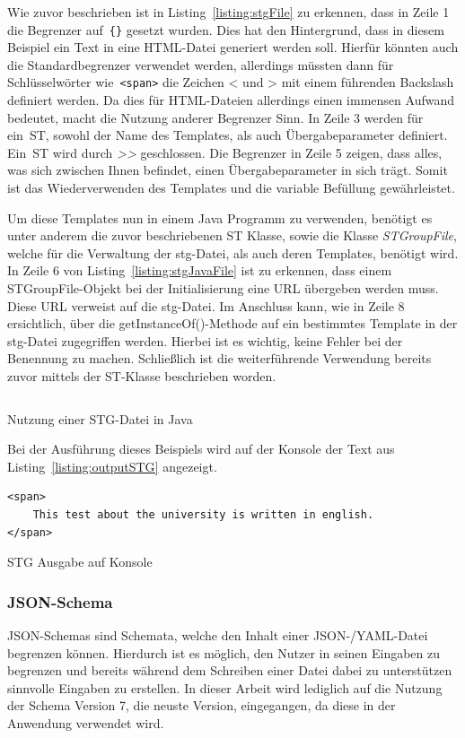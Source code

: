 Wie zuvor beschrieben ist in Listing~\ref{listing:stgFile} zu erkennen, dass in Zeile 1 die Begrenzer auf~\texttt{\{\}} gesetzt wurden.
Dies hat den Hintergrund, dass in diesem Beispiel ein Text in eine HTML-Datei generiert werden soll.
Hierfür könnten auch die Standardbegrenzer verwendet werden, allerdings müssten dann für Schlüsselwörter wie~\texttt{<span>} die Zeichen < und > mit einem führenden Backslash definiert werden.
Da dies für HTML-Dateien allerdings einen immensen Aufwand bedeutet, macht die Nutzung anderer Begrenzer Sinn.
In Zeile 3 werden für ein~\ac{ST}, sowohl der Name des Templates, als auch Übergabeparameter definiert.
Ein~\ac{ST} wird durch \textit{>>} geschlossen.
Die Begrenzer in Zeile 5 zeigen, dass alles, was sich zwischen Ihnen befindet, einen Übergabeparameter in sich trägt.
Somit ist das Wiederverwenden des Templates und die variable Befüllung gewährleistet.

Um diese Templates nun in einem Java Programm zu verwenden, benötigt es unter anderem die zuvor beschriebenen ST Klasse, sowie
die Klasse \textit{STGroupFile}, welche für die Verwaltung der stg-Datei, als auch deren Templates, benötigt wird.
In Zeile 6 von Listing~\ref{listing:stgJavaFile} ist zu erkennen, dass einem STGroupFile-Objekt bei der Initialisierung eine URL übergeben werden muss.
Diese URL verweist auf die stg-Datei.
Im Anschluss kann, wie in Zeile 8 ersichtlich, über die getInstanceOf()-Methode auf ein bestimmtes Template in der stg-Datei zugegriffen werden.
Hierbei ist es wichtig, keine Fehler bei der Benennung zu machen.
Schließlich ist die weiterführende Verwendung bereits zuvor mittels der ST-Klasse beschrieben worden.

\begin{listing}[!ht]
    \inputminted{java}{listings/2.2.1/JavaSTGExample.java}
    \caption{Nutzung einer STG-Datei in Java}
    \label{listing:stgJavaFile}
\end{listing}

Bei der Ausführung dieses Beispiels wird auf der Konsole der Text aus Listing~\ref{listing:outputSTG} angezeigt.

\begin{listing}[!ht]
    \begin{verbatim}
<span>
    This test about the university is written in english.
</span>
    \end{verbatim}
    \caption{STG Ausgabe auf Konsole}
    \label{listing:outputSTG}
\end{listing}

\subsubsection{JSON-Schema}\label{subsubsec:json-schema}
JSON-Schemas sind Schemata, welche den Inhalt einer JSON-/YAML-Datei begrenzen können.
Hierdurch ist es möglich, den Nutzer in seinen Eingaben zu begrenzen und bereits während dem Schreiben einer Datei dabei zu unterstützen sinnvolle Eingaben zu erstellen.
In dieser Arbeit wird lediglich auf die Nutzung der Schema Version 7, die neuste Version, eingegangen, da diese in der Anwendung verwendet wird.

